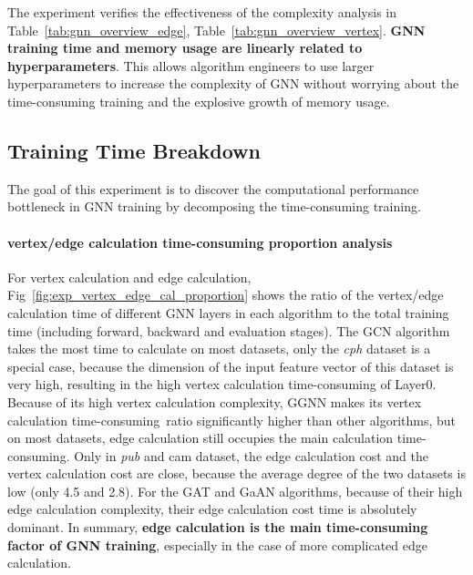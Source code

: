 The experiment verifies the effectiveness of the complexity analysis in Table~\ref{tab:gnn_overview_edge}, Table~\ref{tab:gnn_overview_vertex}. \textbf{GNN training time and memory usage are linearly related to hyperparameters}.
This allows algorithm engineers to use larger hyperparameters to increase the complexity of GNN without worrying about the time-consuming training and the explosive growth of memory usage.

\subsection{Training Time Breakdown}
\label{sec:training_time_breakdown}

The goal of this experiment is to discover the computational performance bottleneck in GNN training
by decomposing the time-consuming training.

\paragraph{vertex/edge calculation time-consuming proportion analysis}

For vertex calculation and edge calculation, Fig~\ref{fig:exp_vertex_edge_cal_proportion} shows the ratio of the vertex/edge calculation time of different GNN layers in each algorithm
to the total training time (including forward, backward and evaluation stages). The GCN algorithm takes the most time to calculate on most datasets, 
only the \textit{cph} dataset is a special case, because the dimension of the input feature vector of this dataset is very high, resulting in the 
high vertex calculation time-consuming of Layer0. Because of its high vertex calculation complexity, GGNN makes its vertex calculation time-consuming\
ratio significantly higher than other algorithms, but on most datasets, edge calculation still occupies the main calculation time-consuming. 
Only in \textit{pub} and cam dataset, the edge calculation cost and the vertex calculation cost are close, because the average degree of the two datasets is low (only 4.5 and 2.8).
For the GAT and GaAN algorithms, because of their high edge calculation complexity, their edge calculation cost time is absolutely dominant. 
In summary, \textbf{edge calculation is the main time-consuming factor of GNN training}, especially in the case of more complicated edge calculation.

